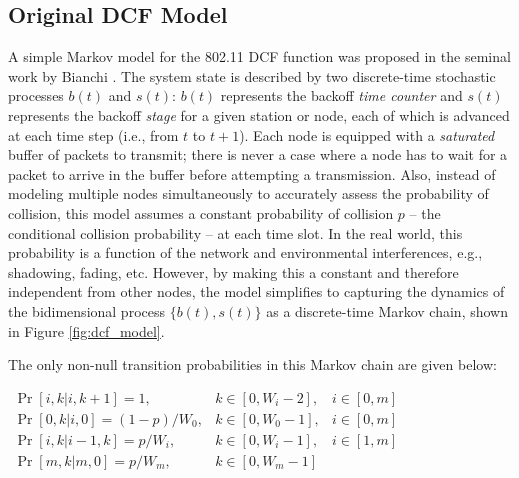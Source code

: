 \documentclass{llncs}
\begin{document}
\subsection{Original DCF Model}
A simple Markov model for the 802.11 DCF function was proposed in the seminal work by Bianchi \cite{dcf}. The system state is described by two discrete-time stochastic processes $b(t)$ and $s(t)$: $b(t)$ represents the backoff \emph{time counter} and $s(t)$ represents the backoff \emph{stage} for a given station or node, each of which is advanced at each time step (i.e., from $t$ to $t + 1$). Each node is equipped with a \emph{saturated} buffer of packets to transmit; there is never a case where a node has to wait for a packet to arrive in the buffer before attempting a transmission. Also, instead of modeling multiple nodes simultaneously to accurately assess the probability of collision, this model assumes a constant probability of collision $p$ -- the conditional collision probability -- at each time slot. In the real world, this probability is a function of the network and environmental interferences, e.g., shadowing, fading, etc. However, by making this a constant and therefore independent from other nodes, the model simplifies to capturing the dynamics of the bidimensional process $\{ b(t), s(t) \}$ as a discrete-time Markov chain, shown in Figure \ref{fig:dcf_model}. 

The only non-null transition probabilities in this Markov chain are given below:

\begin{center}
\begin{math}
\boxed{
\begin{array}{lll}
\Pr[i,k | i, k + 1] = 1, & k \in [0, W_i - 2], & i \in [0,m] \\
\Pr[0,k | i, 0] = (1-p)/W_0, & k \in [0, W_0 - 1], & i \in [0,m] \\
\Pr[i,k | i-1, k] = p/W_i, & k \in [0, W_i - 1], & i \in [1,m] \\
\Pr[m,k | m,0] = p/W_m, & k \in [0, W_m - 1] & ~
\end{array}
}
\end{math}
\end{center}
\end{document}
